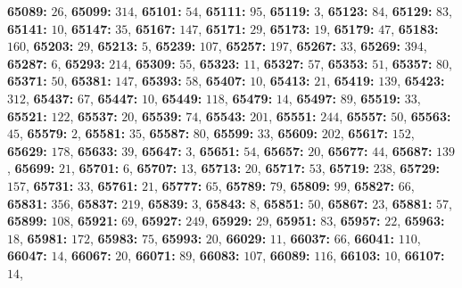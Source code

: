 \textsf{\bfseries 65089:} $26$, \textsf{\bfseries 65099:} $314$, \textsf{\bfseries 65101:} $54$, \textsf{\bfseries 65111:} $95$, \textsf{\bfseries 65119:} $3$, \textsf{\bfseries 65123:} $84$, \textsf{\bfseries 65129:} $83$, \textsf{\bfseries 65141:} $10$, \textsf{\bfseries 65147:} $35$, \textsf{\bfseries 65167:} $147$, \textsf{\bfseries 65171:} $29$, \textsf{\bfseries 65173:} $19$, \textsf{\bfseries 65179:} $47$, \textsf{\bfseries 65183:} $160$, \textsf{\bfseries 65203:} $29$, \textsf{\bfseries 65213:} $5$, \textsf{\bfseries 65239:} $107$, \textsf{\bfseries 65257:} $197$, \textsf{\bfseries 65267:} $33$, \textsf{\bfseries 65269:} $394$, \textsf{\bfseries 65287:} $6$, \textsf{\bfseries 65293:} $214$, \textsf{\bfseries 65309:} $55$, \textsf{\bfseries 65323:} $11$, \textsf{\bfseries 65327:} $57$, \textsf{\bfseries 65353:} $51$, \textsf{\bfseries 65357:} $80$, \textsf{\bfseries 65371:} $50$, \textsf{\bfseries 65381:} $147$, \textsf{\bfseries 65393:} $58$, \textsf{\bfseries 65407:} $10$, \textsf{\bfseries 65413:} $21$, \textsf{\bfseries 65419:} $139$, \textsf{\bfseries 65423:} $312$, \textsf{\bfseries 65437:} $67$, \textsf{\bfseries 65447:} $10$, \textsf{\bfseries 65449:} $118$, \textsf{\bfseries 65479:} $14$, \textsf{\bfseries 65497:} $89$, \textsf{\bfseries 65519:} $33$, \textsf{\bfseries 65521:} $122$, \textsf{\bfseries 65537:} $20$, \textsf{\bfseries 65539:} $74$, \textsf{\bfseries 65543:} $201$, \textsf{\bfseries 65551:} $244$, \textsf{\bfseries 65557:} $50$, \textsf{\bfseries 65563:} $45$, \textsf{\bfseries 65579:} $2$, \textsf{\bfseries 65581:} $35$, \textsf{\bfseries 65587:} $80$, \textsf{\bfseries 65599:} $33$, \textsf{\bfseries 65609:} $202$, \textsf{\bfseries 65617:} $152$, \textsf{\bfseries 65629:} $178$, \textsf{\bfseries 65633:} $39$, \textsf{\bfseries 65647:} $3$, \textsf{\bfseries 65651:} $54$, \textsf{\bfseries 65657:} $20$, \textsf{\bfseries 65677:} $44$, \textsf{\bfseries 65687:} $139$, \textsf{\bfseries 65699:} $21$, \textsf{\bfseries 65701:} $6$, \textsf{\bfseries 65707:} $13$, \textsf{\bfseries 65713:} $20$, \textsf{\bfseries 65717:} $53$, \textsf{\bfseries 65719:} $238$, \textsf{\bfseries 65729:} $157$, \textsf{\bfseries 65731:} $33$, \textsf{\bfseries 65761:} $21$, \textsf{\bfseries 65777:} $65$, \textsf{\bfseries 65789:} $79$, \textsf{\bfseries 65809:} $99$, \textsf{\bfseries 65827:} $66$, \textsf{\bfseries 65831:} $356$, \textsf{\bfseries 65837:} $219$, \textsf{\bfseries 65839:} $3$, \textsf{\bfseries 65843:} $8$, \textsf{\bfseries 65851:} $50$, \textsf{\bfseries 65867:} $23$, \textsf{\bfseries 65881:} $57$, \textsf{\bfseries 65899:} $108$, \textsf{\bfseries 65921:} $69$, \textsf{\bfseries 65927:} $249$, \textsf{\bfseries 65929:} $29$, \textsf{\bfseries 65951:} $83$, \textsf{\bfseries 65957:} $22$, \textsf{\bfseries 65963:} $18$, \textsf{\bfseries 65981:} $172$, \textsf{\bfseries 65983:} $75$, \textsf{\bfseries 65993:} $20$, \textsf{\bfseries 66029:} $11$, \textsf{\bfseries 66037:} $66$, \textsf{\bfseries 66041:} $110$, \textsf{\bfseries 66047:} $14$, \textsf{\bfseries 66067:} $20$, \textsf{\bfseries 66071:} $89$, \textsf{\bfseries 66083:} $107$, \textsf{\bfseries 66089:} $116$, \textsf{\bfseries 66103:} $10$, \textsf{\bfseries 66107:} $14$, 

